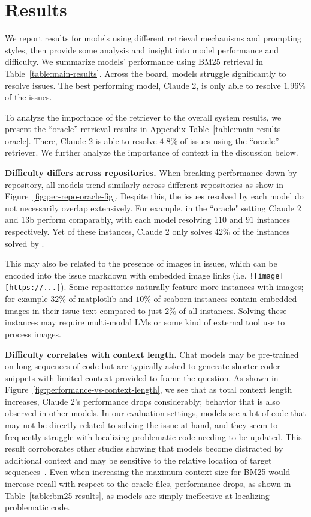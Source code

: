 \section{Results}
\label{sec:results}
We report results for models using different retrieval mechanisms and prompting styles, then provide some analysis and insight into model performance and difficulty.
We summarize models' performance using BM25 retrieval in Table~\ref{table:main-results}. 
Across the board, models struggle significantly to resolve issues.
The best performing model, Claude 2, is only able to resolve $1.96\%$ of the issues.

To analyze the importance of the retriever to the overall system results, we present the ``oracle'' retrieval results in Appendix Table~\ref{table:main-results-oracle}. There, Claude 2 is able to resolve $4.8\%$ of issues using the ``oracle'' retriever. We further analyze the importance of context in the discussion below. 





\textbf{Difficulty differs across repositories.}
When breaking performance down by repository, all models trend similarly across different repositories as show in Figure~\ref{fig:per-repo-oracle-fig}.
Despite this, the issues resolved by each model do not necessarily overlap extensively.
For example, in the ``oracle" setting Claude 2 and \swellama{} 13b perform comparably, with each model resolving $110$ and $91$ instances respectively. Yet of these instances, Claude 2 only solves $42\%$ of the instances solved by \swellama{}.

This may also be related to the presence of images in issues, which can be encoded into the issue markdown with embedded image links (i.e. \lstinline{![image][https://...]}). Some repositories naturally feature more instances with images; for example $32$\% of matplotlib and $10$\% of seaborn instances contain embedded images in their issue text compared to just $2$\% of all instances. Solving these instances may require multi-modal LMs or some kind of external tool use to process images.

\textbf{Difficulty correlates with context length.}
Chat models may be pre-trained on long sequences of code but are typically asked to generate shorter coder snippets with limited context provided to frame the question.
As shown in Figure~\ref{fig:performance-vs-context-length}, we see that as total context length increases, Claude 2's performance drops considerably; behavior that is also observed in other models.
In our evaluation settings, models see a lot of code that may not be directly related to solving the issue at hand, and they seem to frequently struggle with localizing problematic code needing to be updated.
This result corroborates other studies showing that models become distracted by additional context and may be sensitive to the relative location of target sequences~\citep{liulostinthemiddle}.
Even when increasing the maximum context size for BM25 would increase recall with respect to the oracle files, performance drops, as shown in Table~\ref{table:bm25-results}, as models are simply ineffective at localizing problematic code.

